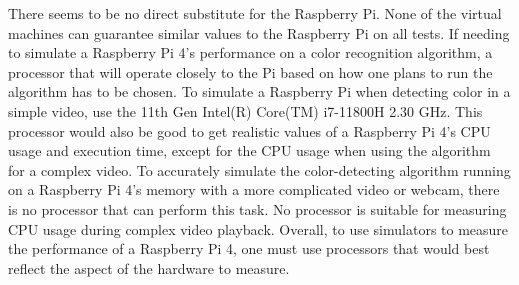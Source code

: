 There seems to be no direct substitute for the Raspberry Pi. None of the virtual machines can guarantee similar values to the Raspberry Pi on all tests. If needing to simulate a Raspberry Pi 4's performance on a color recognition algorithm, a processor that will operate closely to the Pi based on how one plans to run the algorithm has to be chosen. To simulate a Raspberry Pi when detecting color in a simple video, use the 11th Gen Intel(R) Core(TM) i7-11800H 2.30 GHz. This processor would also be good to get realistic values of a Raspberry Pi 4's CPU usage and execution time, except for the CPU usage when using the algorithm for a complex video. To accurately simulate the color-detecting algorithm running on a Raspberry Pi 4's memory with a more complicated video or webcam, there is no processor that can perform this task. No processor is suitable for measuring CPU usage during complex video playback. Overall, to use simulators to measure the performance of a Raspberry Pi 4, one must use processors that would best reflect the aspect of the hardware to measure.
